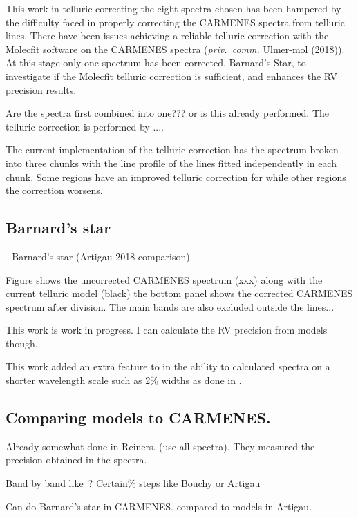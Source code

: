 This work in telluric correcting the eight spectra chosen has been hampered by the difficulty faced in properly correcting the {CARMENES} spectra from telluric lines.
There have been issues achieving a reliable telluric correction with the Molecfit software on the {CARMENES} spectra (\emph{priv.\ comm.} Ulmer-mol (2018)).
At this stage only one spectrum has been corrected, Barnard's Star, to investigate if the Molecfit telluric correction is sufficient, and enhances the {RV} precision results.

Are the spectra first combined into one??? or is this already performed.
The telluric correction is performed by ....


The current implementation of the telluric correction has the spectrum broken into three chunks with the line profile of the lines fitted independently in each chunk.
Some regions have an improved telluric correction for while other regions the correction worsens.

\subsection{Barnard's star}
- Barnard's star (Artigau 2018 comparison)

Figure \citep{} shows the uncorrected {CARMENES} spectrum (xxx) along with the current telluric model (black) the bottom panel shows the corrected {CARMENES} spectrum after division.
The main \nir{}  bands are also excluded outside the lines...


This work is work in progress.
{I can calculate the {RV} precision from models though.}




This work added an extra feature to \eniric{} in the ability to calculated spectra on a shorter wavelength scale such as 2\% widths as done in \citep{artigau_optical_2018}.


\subsection{Comparing models to {CARMENES}.}
Already somewhat done in Reiners.
(use all spectra).
They measured the precision obtained in the spectra.

Band by band like~\citet{figueira_radial_2016}?
Certain\% steps like Bouchy or Artigau


Can do Barnard's star in {CARMENES}.
 compared to models in Artigau.



